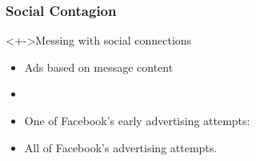 
\begin{frame}
  \frametitle{Social Contagion}

  \begin{block}<+->{Messing with social connections}
    \begin{itemize}
    \item<+-> 
      Ads based on message content \\
    \item<+-> 
    \item<+-> 
      One of Facebook's early advertising attempts: 
    \item<+-> 
      All of Facebook's advertising attempts.
    \end{itemize}
  \end{block}

\end{frame}



